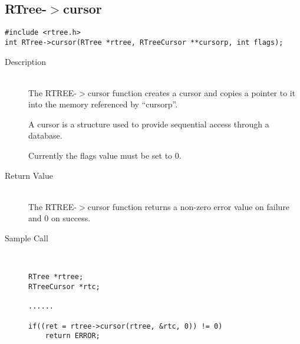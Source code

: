 \documentclass[12pt]{article}
\def\cdf{\sf }
\def\cdf{\sf }
\newcommand{\RTREE}{{\small{\cdf RTree}}}
\begin{document}
\subsection{{\RTREE}-$>$cursor}
\begin{verbatim}
#include <rtree.h>
int RTree->cursor(RTree *rtree, RTreeCursor **cursorp, int flags);
\end{verbatim}
\begin{description}
\item[Description]\ \\

  The RTREE-$>$cursor function creates a cursor and copies a pointer
  to it into the memory referenced by ``cursorp''.

  A cursor is a structure used to provide sequential access through a
  database.
  
  Currently the flags value must be set to 0.

\item[Return Value]\ \\
  The RTREE-$>$cursor function returns a non-zero error value on
  failure and 0 on success.
\item[Sample Call]\ 
\begin{verbatim}
RTree *rtree;
RTreeCursor *rtc;

......

if((ret = rtree->cursor(rtree, &rtc, 0)) != 0)
    return ERROR;
\end{verbatim}
\end{description}

\newpage
\end{document}
